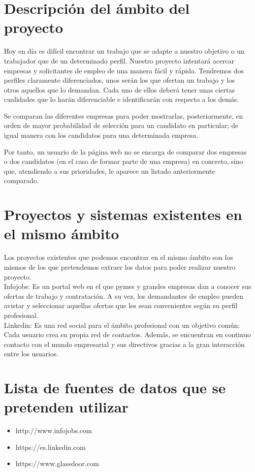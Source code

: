 \section{Descripción del ámbito del proyecto}
Hoy en día es difícil encontrar un trabajo que se adapte a nuestro objetivo o un trabajador que de un determinado perfil. Nuestro proyecto intentará acercar empresas y solicitantes de empleo de una manera fácil y rápida.
Tendremos dos perfiles claramente diferenciados, unos serán los que ofertan un trabajo y los otros aquellos que lo demandan. Cada uno de ellos deberá tener unas ciertas cualidades que lo harán diferenciable e identificarán con respecto a los demás. 

Se comparan las diferentes empresas para poder mostrarlas, posteriormente, en orden de mayor probabilidad de selección para un candidato en particular; de igual manera con los candidatos para una determinada empresa.

Por tanto, un usuario de la página web no se encarga de comparar dos empresas o dos candidatos (en el caso de formar parte de una empresa) en concreto, sino que, atendiendo a sus prioridades, le aparece un listado anteriormente comparado.


\section{Proyectos y sistemas existentes en el mismo ámbito}
Los proyectos existentes que podemos encontrar en el mismo ámbito son los mismos de los que pretendemos extraer los datos para poder realizar nuestro proyecto. \\

Infojobs: Es un portal web en el que pymes y grandes empresas dan a conocer sus ofertas de trabajo y contratación. A su vez, los demandantes de empleo pueden avistar y seleccionar aquellas ofertas que les sean convenientes según su perfil profesional. \\

Linkedin: Es una red social para el ámbito profesional con un objetivo común: Cada usuario crea su propia red de contactos. Además, se encuentran en continuo contacto con el mundo empresarial y sus directivos gracias a la gran interacción entre los usuarios.
	
\section{Lista de fuentes de datos que se pretenden utilizar}
\begin{itemize}
	\item http://www.infojobs.com
	\item https://es.linkedin.com
	\item https://www.glassdoor.com
\end{itemize}	
	
